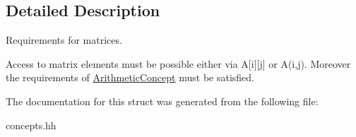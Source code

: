 \subsection{Detailed Description}
Requirements for matrices. 

Access to matrix elements must be possible either via A\mbox{[}i\mbox{]}\mbox{[}j\mbox{]} or A(i,j). Moreover the requirements of \hyperlink{structRFFGen_1_1Concepts_1_1ArithmeticConcept}{Arithmetic\-Concept} must be satisfied. 

The documentation for this struct was generated from the following file\-:\begin{DoxyCompactItemize}
\item 
concepts.\-hh\end{DoxyCompactItemize}
